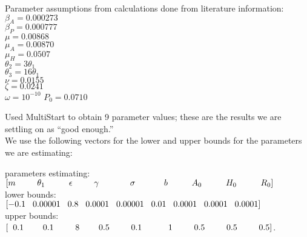 \documentclass[12pt]{article}
\begin{document}
Parameter assumptions from calculations done from literature information: \\
$\beta_A=0.000273$ \\
$\beta_P=0.000777$ \\
$\mu=0.00868$ \\
$\mu_{A}=0.00870$ \\
$\mu_{H}=0.0507$ \\
$\theta_2=3 \theta_1$ \\
$\theta_3=16\theta_1$ \\
$\nu=0.0155$ \\ 
$\zeta=0.0241$ \\
$\omega=10^{-10}$ 
$P_0=0.0710$

Used MultiStart to obtain 9 parameter values; these are the results we are settling on as ``good enough.''  \\
We use the following vectors for the lower and upper bounds for the parameters we are estimating: 

parameters estimating: $[m \hspace{0.9cm}   \theta_1 \hspace{1cm}   \epsilon \hspace{0.9cm} \gamma \hspace{1.3cm}  \sigma \hspace{1.2cm}   b \hspace{1cm}    A_0 \hspace{1cm}   H_0  \hspace{1cm}   R_0 ]$ \\
lower bounds:  \hspace{1.2cm} $[-0.1 \hspace{0.3cm}  0.00001 \hspace{0.3cm}    0.8 \hspace{0.3cm}      0.0001  \hspace{0.3cm}        0.00001 \hspace{0.3cm}     0.01 \hspace{0.3cm}     0.0001 \hspace{0.3cm}    0.0001 \hspace{0.3cm}     0.0001  ]$ \\
upper bounds:\hspace{1.2cm} $[\hspace{0.2cm}0.1 \hspace{0.8cm}     0.1  \hspace{0.9cm}        8  \hspace{0.8cm}        0.5  \hspace{0.9cm}           0.1 \hspace{1.1cm}        1  \hspace{0.9cm}        0.5   \hspace{0.9cm}     0.5    \hspace{0.9cm}    0.5     ]$.
\end{document}
